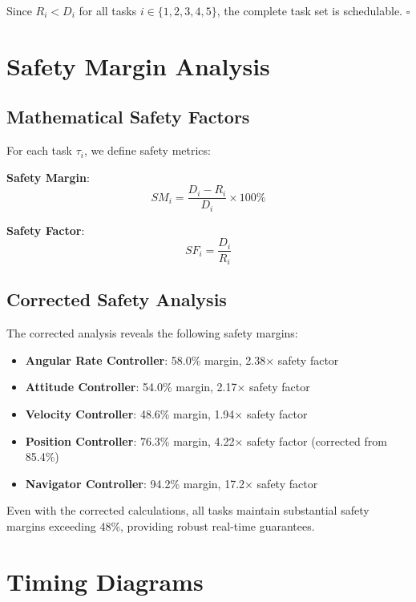 \documentclass[11pt,a4paper]{article}
\theoremstyle{definition}
\theoremstyle{remark}
\begin{document}
Since $R_i < D_i$ for all tasks $i \in \{1,2,3,4,5\}$, the complete task set is schedulable. $\square$

\section{Safety Margin Analysis}

\subsection{Mathematical Safety Factors}

For each task $\tau_i$, we define safety metrics:

\textbf{Safety Margin}:
\begin{equation}
SM_i = \frac{D_i - R_i}{D_i} \times 100\%
\end{equation}

\textbf{Safety Factor}:
\begin{equation}
SF_i = \frac{D_i}{R_i}
\end{equation}

\subsection{Corrected Safety Analysis}

The corrected analysis reveals the following safety margins:

\begin{itemize}
\item \textbf{Angular Rate Controller}: 58.0\% margin, 2.38× safety factor
\item \textbf{Attitude Controller}: 54.0\% margin, 2.17× safety factor
\item \textbf{Velocity Controller}: 48.6\% margin, 1.94× safety factor
\item \textbf{Position Controller}: 76.3\% margin, 4.22× safety factor (corrected from 85.4\%)
\item \textbf{Navigator Controller}: 94.2\% margin, 17.2× safety factor
\end{itemize}

Even with the corrected calculations, all tasks maintain substantial safety margins exceeding 48\%, providing robust real-time guarantees.

\section{Timing Diagrams}
\end{document}
